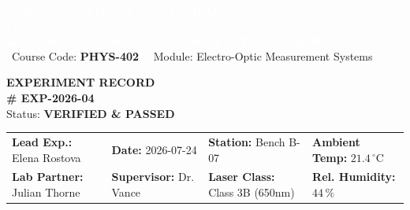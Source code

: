 \documentclass[11pt,a4paper,parskip=half,headsepline=0.6pt,footsepline=0.4pt]{scrartcl}
\begin{document}
\begin{tcolorbox}[labbox, colback=navyprimary, colframe=navyprimary, top=7pt, bottom=7pt, left=8pt, right=8pt]
\begin{minipage}[c]{0.68\linewidth}
  \textcolor{white}{\small \textbf{VERTEX INSTITUTE OF TECHNOLOGY} \ \textbar\ Department of Applied Physics}\\
  \vspace{1pt}
  {\Large \bfseries \textcolor{white}{Laser Diode Dynamics, Interferometry \& TIA Circuit Record}} \\
  \vspace{2pt}
  \textcolor{tealaccent!30}{\small \faMicrochip\ Course Code: \textbf{PHYS-402} \ \textbar\ Module: Electro-Optic Measurement Systems}
\end{minipage}%
\hfill
\begin{minipage}[c]{0.29\linewidth}
  \begin{tcolorbox}[enhanced, colback=white, colframe=tealaccent, boxrule=0.8pt, arc=3pt, top=3pt, bottom=3pt, left=4pt, right=4pt]
    \centering
    \textcolor{navyprimary}{\footnotesize \textbf{EXPERIMENT RECORD}}\\
    \vspace{1pt}
    \textcolor{coralhighlight}{\large \textbf{\# EXP-2026-04}}\\
    \vspace{1pt}
    \textcolor{darkgraytext}{\tiny Status: \textbf{VERIFIED \& PASSED}}
  \end{tcolorbox}
\end{minipage}
\end{tcolorbox}

\vspace{-4pt}

\begin{tcolorbox}[accentcard, colback=lightbg, colframe=bordergray, top=3pt, bottom=3pt, left=6pt, right=6pt]
\small
\begin{tabularx}{\linewidth}{>{\raggedright\arraybackslash}X >{\raggedright\arraybackslash}X >{\raggedright\arraybackslash}X >{\raggedright\arraybackslash}X}
  \textbf{Lead Exp.:} Elena Rostova & \textbf{Date:} 2026-07-24 & \textbf{Station:} Bench B-07 & \textbf{Ambient Temp:} $21.4\,^{\circ}\text{C}$ \\
  \textbf{Lab Partner:} Julian Thorne & \textbf{Supervisor:} Dr. Vance & \textbf{Laser Class:} Class 3B (650nm) & \textbf{Rel. Humidity:} $44\,\%$
\end{tabularx}
\end{tcolorbox}
\end{document}
